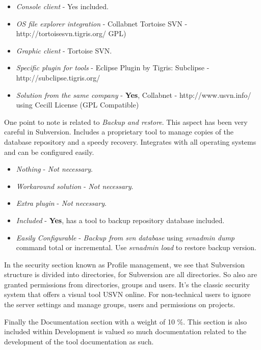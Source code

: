\documentclass[11pt]{scrartcl}
\begin{document}
\begin{itemize}
    \item \emph{Console client} - Yes included.
    \item \emph{OS file explorer integration} - Collabnet Tortoise SVN - http://tortoisesvn.tigris.org/ GPL)
    \item \emph{Graphic client} - Tortoise SVN.
    \item \emph{Specific plugin for tools} - Eclipse Plugin by Tigris: Subclipse - http://subclipse.tigris.org/
    \item \emph{Solution from the same company} - \textbf{Yes}, Collabnet - http://www.usvn.info/ using Cecill License (GPL Compatible)
\end{itemize}

\par One point to note is related to \emph{Backup and restore}. This aspect has been very careful in Subversion. Includes a proprietary tool to manage copies of the database repository and a speedy recovery. Integrates with all operating systems and can be configured easily.

\begin{itemize}
    \item \emph{Nothing} - \emph{Not necessary}.
    \item \emph{Workaround solution} - \emph{Not necessary}.
    \item \emph{Extra plugin} - \emph{Not necessary}.
    \item \emph{Included} - \textbf{Yes}, has a tool to backup repository database included.
    \item \emph{Easily Configurable} - \emph{Backup from svn database} using \emph{svnadmin dump} command total or incremental. Use \emph{svnadmin load} to restore backup version.
\end{itemize}

\par In the security section known as Profile management, we see that Subversion structure is divided into directories, for Subversion are all directories. So also are granted permissions from directories, groups and users. It's the classic security system that offers a visual tool USVN online. For non-technical users to ignore the server settings and manage groups, users and permissions on projects.

\par Finally the Documentation section with a weight of 10 \%. This section is also included within Development is valued so much documentation related to the development of the tool documentation as such.
\end{document}
